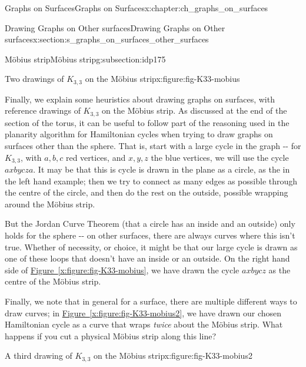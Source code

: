 \documentclass[oneside,10pt,]{book}
\newcommand{\xreffont}{\relax}
\numberwithin{equation}{section}
\begin{document}
\begin{chapterptx}{Graphs on Surfaces}{}{Graphs on Surfaces}{}{}{x:chapter:ch_graphs_on_surfaces}
\begin{sectionptx}{Drawing Graphs on Other surfaces}{}{Drawing Graphs on Other surfaces}{}{}{x:section:s_graphs_on_surfaces_other_surfaces}
\begin{subsectionptx}{Möbius strip}{}{Möbius strip}{}{}{g:subsection:idp175}
\begin{figureptx}{Two drawings of \(K_{3,3}\) on the Möbius strip}{x:figure:fig-K33-mobius}{}
\begin{image}{0}{1}{0}
{
}%
\end{image}%
\tcblower
\end{figureptx}%
Finally, we explain some heuristics about drawing graphs on surfaces, with reference drawings of \(K_{3,3}\) on the Möbius strip.  As discussed at the end of the section of the torus, it can be useful to follow part of the reasoning used in the planarity algorithm for Hamiltonian cycles when trying to draw graphs on surfaces other than the sphere.  That is, start with a large cycle in the graph -{}-{} for \(K_{3,3}\), with \(a,b,c\) red vertices, and \(x,y,z\) the blue vertices, we will use the cycle \(axbycza\).  It may be that this is cycle is drawn in the plane as a circle, as the in the left hand example; then we try to connect as many edges as possible through the centre of the circle, and then do the rest on the outside, possible wrapping around the Möbius strip.%
\par
But the Jordan Curve Theorem (that a circle has an inside and an outside) only holds for the sphere -{}-{} on other surfaces, there are always curves where this isn't true.  Whether of necessity, or choice, it might be that our large cycle is drawn as one of these loops that doesn't have an inside or an outside.  On the right hand side of \hyperref[x:figure:fig-K33-mobius]{Figure~{\xreffont\ref{x:figure:fig-K33-mobius}}}, we have drawn the cycle \(axbycz\) as the centre of the Möbius strip.%
\par
Finally, we note that in general for a surface, there are multiple different ways to draw curves; in \hyperref[x:figure:fig-K33-mobius2]{Figure~{\xreffont\ref{x:figure:fig-K33-mobius2}}}, we have drawn our chosen Hamiltonian cycle as a curve that wraps \emph{twice} about the Möbius strip.  What happens if you cut a physical Möbius strip along this line?%
\begin{figureptx}{A third drawing of \(K_{3,3}\) on the Möbius strip}{x:figure:fig-K33-mobius2}{}%
\begin{image}{0}{1}{0}%
\end{image}
\end{figureptx}
\end{subsectionptx}
\end{sectionptx}
\end{chapterptx}
\end{document}

